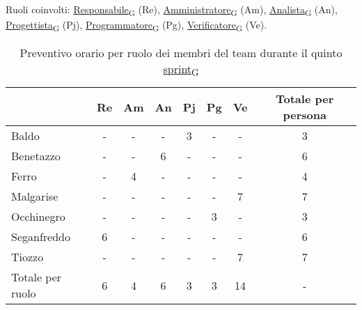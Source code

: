 Ruoli coinvolti: \href{https://7last.github.io/docs/pb/documentazione-interna/glossario\#responsabile}{Responsabile\textsubscript{G}} (Re), \href{https://7last.github.io/docs/pb/documentazione-interna/glossario\#amministratore}{Amministratore\textsubscript{G}} (Am), \href{https://7last.github.io/docs/pb/documentazione-interna/glossario\#analista}{Analista\textsubscript{G}} (An), \href{https://7last.github.io/docs/pb/documentazione-interna/glossario\#progettista}{Progettista\textsubscript{G}} (Pj), \href{https://7last.github.io/docs/pb/documentazione-interna/glossario\#programmatore}{Programmatore\textsubscript{G}} (Pg), \href{https://7last.github.io/docs/pb/documentazione-interna/glossario\#verificatore}{Verificatore\textsubscript{G}} (Ve).
\begin{table}[!h]
    \centering
    \begin{tabular}{ | l | c | c | c | c | c | c | c | }
        \hline
        \textbf{} & \textbf{Re} & \textbf{Am} &\textbf{An} & \textbf{Pj} & \textbf{Pg} & \textbf{Ve} & \textbf{Totale per persona} \\
        \hline
        Baldo            &  -   &  -   &  -   &  3   &  -   &  -   &  3   \\
        Benetazzo        &  -   &  -   &  6   &  -   &  -   &  -   &  6   \\
        Ferro            &  -   &  4   &  -   &  -   &  -   &  -   &  4   \\
        Malgarise        &  -   &  -   &  -   &  -   &  -   &  7   &  7   \\
        Occhinegro       &  -   &  -   &  -   &  -   &  3   &  -   &  3   \\
        Seganfreddo      &  6   &  -   &  -   &  -   &  -   &  -   &  6   \\
        Tiozzo           &  -   &  -   &  -   &  -   &  -   &  7   &  7   \\
        \hline
        Totale per ruolo &  6   &  4   &  6   &  3   &  3   &  14  &  -   \\
        \hline
    \end{tabular}
    \caption{Preventivo orario per ruolo dei membri del team durante il quinto \href{https://7last.github.io/docs/pb/documentazione-interna/glossario\#sprint}{sprint\textsubscript{G}}}
\end{table}

